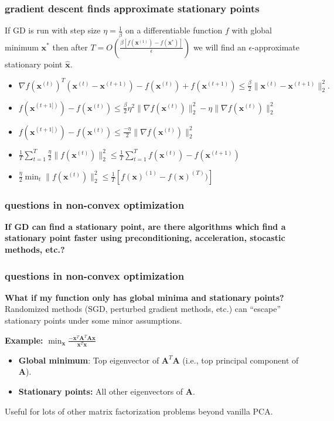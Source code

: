 \documentclass[compress]{beamer}
\newcommand{\bv}[1]{\mathbf{#1}}
\begin{document}
\begin{frame}[t]
	\frametitle{gradient descent finds approximate stationary points}
	\begin{theorem}
		If GD is run with step size $\eta = \frac{1}{\beta}$ on a differentiable function $f$ with global minimum $\bv{x}^*$ then after $T = O(\frac{\beta [f(\bv{x}^{(1)}) - f(\bv{x}^*)]}{\epsilon})$ we will find an $\epsilon$-approximate stationary point $\hat{\bv{x}}$.
	\end{theorem}
\begin{itemize}
	\item  $ \nabla f(\bv{x}^{(t)})^T(\bv{x}^{(t)} - \bv{x}^{(t+1)}) - f(\bv{x}^{(t)}) + f(\bv{x}^{(t+1)}) \leq \frac{\beta}{2}\|\bv{x}^{(t)} - \bv{x}^{(t+1)}\|_2^2.$
	\item $f(\bv{x}^{(t+1])}) - f(\bv{x}^{(t)}) \leq \frac{\beta}{2}\eta^2\|\nabla f(\bv{x}^{(t)})\|_2^2 - \eta \|\nabla f(\bv{x}^{(t)})\|_2^2$ 
	\item $f(\bv{x}^{(t+1])}) - f(\bv{x}^{(t)}) \leq \frac{-\eta}{2}\|\nabla f(\bv{x}^{(t)})\|_2^2$
	\item $\frac{1}{T}\sum_{t=1}^T \frac{\eta}{2}\|f(\bv{x}^{(t)})\|_2^2 \leq \frac{1}{T}\sum_{t=1}^T f(\bv{x}^{(t)}) - f(\bv{x}^{(t+1)})$
	\item $\frac{\eta}{2} \min_t \|f(\bv{x}^{(t)})\|_2^2 \leq \frac{1}{T}\left[f(\bv{x})^{(1)} - f(\bv{x})^{(T)})\right]$
\end{itemize}
	
\end{frame}

\begin{frame}[t]
	\frametitle{questions in non-convex optimization}
	\textbf{If GD can find a stationary point, are there algorithms which find a stationary point faster using preconditioning, acceleration, stocastic methods, etc.?}
\end{frame}

\begin{frame}[t]
	\frametitle{questions in non-convex optimization}
	\textbf{What if my function only has global minima and stationary points?}
	Randomized methods (SGD, perturbed gradient methods, etc.) can ``escape'' stationary points under some minor assumptions.
	\vspace{1em}
	
	
	\textbf{Example:} $\min_{\bv{x}} \frac{-\bv{x}^T\bv{A}^T\bv{A}\bv{x}}{\bv{x}^T\bv{x}}$
	\begin{itemize}
		\item \textbf{Global minimum}: Top eigenvector of $\bv{A}^T\bv{A}$ (i.e., top principal component of $\bv{A}$).
		\item \textbf{Stationary points:} All other eigenvectors of $\bv{A}$. 
	\end{itemize}
\begin{center}
	\alert{Useful for lots of other matrix factorization problems beyond vanilla PCA.}
\end{center}
\end{frame}
\end{document}

